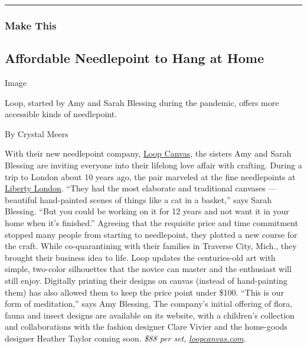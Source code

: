 \begin{center}\rule{0.5\linewidth}{\linethickness}\end{center}

\hypertarget{make-this}{%
\subsubsection{Make This}\label{make-this}}

\hypertarget{affordable-needlepoint-to-hang-at-home}{%
\subsection{Affordable Needlepoint to Hang at
Home}\label{affordable-needlepoint-to-hang-at-home}}

Image

Loop, started by Amy and Sarah Blessing during the pandemic, offers more
accessible kinds of needlepoint.~

By Crystal Meers

With their new needlepoint company,
\href{https://www.instagram.com/loopcanvas/}{Loop Canvas}, the sisters
Amy and Sarah Blessing are inviting everyone into their lifelong love
affair with crafting. During a trip to London about 10 years ago, the
pair marveled at the fine needlepoints at
\href{https://www.libertylondon.com/us/home?gclid=EAIaIQobChMIo5uIwPLK6wIVC43ICh2kfwcIEAAYASAAEgKVEPD_BwE}{Liberty
London}. ``They had the most elaborate and traditional canvases ---
beautiful hand-painted scenes of things like a cat in a basket,'' says
Sarah Blessing. ``But you could be working on it for 12 years and not
want it in your home when it's finished.'' Agreeing that the requisite
price and time commitment stopped many people from starting to
needlepoint, they plotted a new course for the craft. While
co-quarantining with their families in Traverse City, Mich., they
brought their business idea to life. Loop updates the centuries-old art
with simple, two-color silhouettes that the novice can master and the
enthusiast will still enjoy. Digitally printing their designs on canvas
(instead of hand-painting them) has also allowed them to keep the price
point under \$100. ``This is our form of meditation,'' says Amy
Blessing. The company's initial offering of flora, fauna and insect
designs are available on its website, with a children's collection and
collaborations with the fashion designer Clare Vivier and the home-goods
designer Heather Taylor coming soon. \emph{\$88 per set,}
\href{http://loopcanvas.com/}{\emph{loopcanvas.com}}\emph{.}

